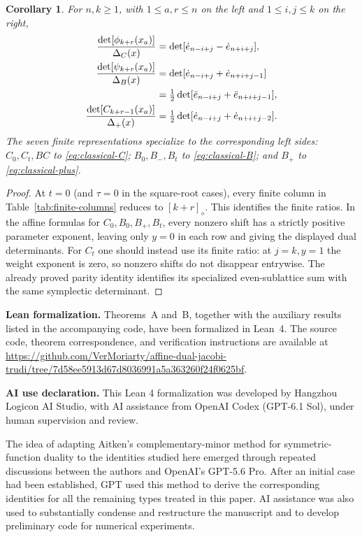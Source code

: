 \documentclass[12pt]{article}
\newtheorem{corollary}[theorem]{Corollary}
\numberwithin{equation}{section}
\newcommand{\dote}{\dot e}
\newcommand{\ddote}{\ddot e}
\newcommand{\ph}{\phi}
\newcommand{\ps}{\psi}
\begin{document}
\begin{corollary}
For $n,k\ge1$, with $1\le a,r\le n$ on the left and
$1\le i,j\le k$ on the right,
\begin{align}
 \frac{\det[\ph_{k+r}(x_a)]}{\Delta_C(x)}
 &=\det[\dote_{n-i+j}-\dote_{n+i+j}],\label{eq:classical-C}\\
 \frac{\det[\ps_{k+r}(x_a)]}{\Delta_B(x)}
 &=\det[\dote_{n-i+j}+\dote_{n+i+j-1}]\notag\\
 &=\tfrac12\det[\ddote_{n-i+j}+\ddote_{n+i+j-1}],
 \label{eq:classical-B}\\
 \frac{\det[C_{k+r-1}(x_a)]}{\Delta_+(x)}
 &=\tfrac12\det[\dote_{n-i+j}+\dote_{n+i+j-2}].
 \label{eq:classical-plus}
\end{align}
The seven finite representations specialize to the corresponding left
sides: $C_0,C_t,BC$ to \eqref{eq:classical-C};
$B_0,B_-,B_t$ to \eqref{eq:classical-B}; and $B_+$ to
\eqref{eq:classical-plus}.
\end{corollary}

\begin{proof}
At $t=0$ (and $\tau=0$ in the square-root cases), every finite
column in Table~\ref{tab:finite-columns} reduces to
$[k+r]_\diamond$.  This identifies the finite ratios.
In the affine formulas for $C_0,B_0,B_+,B_t$, every nonzero shift
has a strictly positive parameter exponent, leaving only $y=0$ in
each row and giving the displayed dual determinants.
For $C_t$ one should instead use its finite ratio: at $j=k,y=1$
the weight exponent is zero, so nonzero shifts do not disappear
entrywise.  The already proved parity identity identifies its
specialized even-sublattice sum with the same symplectic determinant.
\end{proof}


\medskip
\noindent\textbf{Lean formalization.}
Theorems~A and~B, together with the auxiliary results listed in the
accompanying code, have been formalized in Lean~4. The source code,
theorem correspondence, and verification instructions are available at
\url{https://github.com/VerMoriarty/affine-dual-jacobi-trudi/tree/7d58ee5913d67d8036991a5a363260f24f0625bf}.

\medskip
\noindent\textbf{AI use declaration.}
This Lean 4 formalization was developed by Hangzhou Logicon AI Studio, with AI assistance from OpenAI Codex (GPT-6.1 Sol), under human supervision and review.

The idea of adapting Aitken's complementary-minor method for
symmetric-function duality to the identities studied here emerged
through repeated discussions between the authors and OpenAI's
GPT-5.6 Pro. After an initial case had been established, GPT
used this method to derive the corresponding identities for all
the remaining types treated in this paper. AI assistance was also
used to substantially condense and restructure the manuscript and
to develop preliminary code for numerical experiments.
\end{document}
